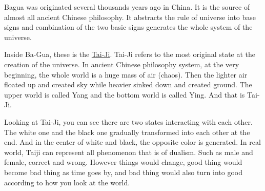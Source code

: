 \documentclass[]{book}
\begin{document}
Bagua was originated several thousands years ago in China. It is the
source of almost all ancient Chinese philosophy. It abstracts the rule
of universe into base signs and combination of the two basic signs
generates the whole system of the universe.

Inside Ba-Gua, these is the
\href{http://en.wikipedia.org/wiki/Taiji_(philosophy)}{Tai-Ji}. Tai-Ji
refers to the most original state at the creation of the universe. In
ancient Chinese philosophy system, at the very beginning, the whole
world is a huge mass of air (chaos). Then the lighter air floated up and
created sky while heavier sinked down and created ground. The upper
world is called Yang and the bottom world is called Ying. And that is
Tai-Ji.

Looking at Tai-Ji, you can see there are two states interacting with
each other. The white one and the black one gradually transformed into
each other at the end. And in the center of white and black, the
opposite color is generated. In real world, Taiji can represent all
phenomenon that is of dualism. Such as male and female, correct and
wrong. However things would change, good thing would become bad thing as
time goes by, and bad thing would also turn into good according to how
you look at the world.
\end{document}
